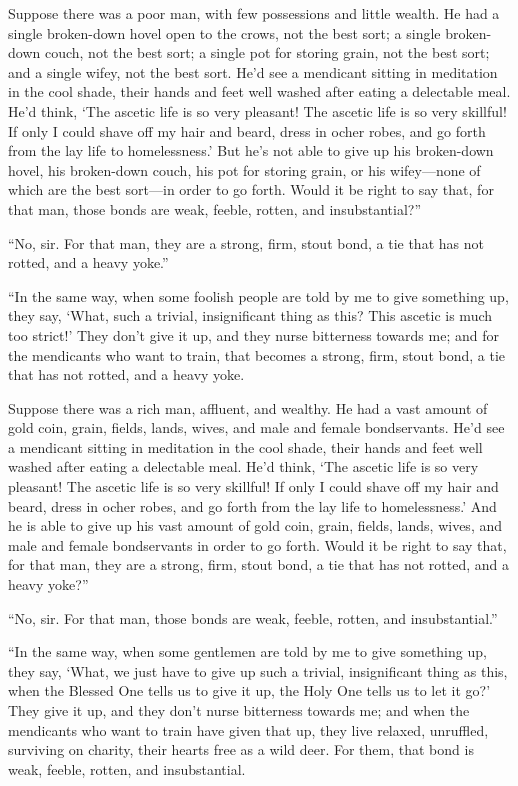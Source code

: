 \documentclass[12pt,openany]{book}%
\begin{document}
Suppose there was a poor man, with few possessions and little wealth. He had a single broken-down hovel open to the crows, not the best sort; a single broken-down couch, not the best sort; a single pot for storing grain, not the best sort; and a single wifey, not the best sort. He’d see a mendicant sitting in meditation in the cool shade, their hands and feet well washed after eating a delectable meal. He’d think, ‘The ascetic life is so very pleasant! The ascetic life is so very skillful! If only I could shave off my hair and beard, dress in ocher robes, and go forth from the lay life to homelessness.’ But he’s not able to give up his broken-down hovel, his broken-down couch, his pot for storing grain, or his wifey—none of which are the best sort—in order to go forth. Would it be right to say that, for that man, those bonds are weak, feeble, rotten, and insubstantial?” 

“No, sir. For that man, they are a strong, firm, stout bond, a tie that has not rotted, and a heavy yoke.” 

“In the same way, when some foolish people are told by me to give something up, they say, ‘What, such a trivial, insignificant thing as this? This ascetic is much too strict!’ They don’t give it up, and they nurse bitterness towards me; and for the mendicants who want to train, that becomes a strong, firm, stout bond, a tie that has not rotted, and a heavy yoke. 

Suppose there was a rich man, affluent, and wealthy. He had a vast amount of gold coin, grain, fields, lands, wives, and male and female bondservants. He’d see a mendicant sitting in meditation in the cool shade, their hands and feet well washed after eating a delectable meal. He’d think, ‘The ascetic life is so very pleasant! The ascetic life is so very skillful! If only I could shave off my hair and beard, dress in ocher robes, and go forth from the lay life to homelessness.’ And he is able to give up his vast amount of gold coin, grain, fields, lands, wives, and male and female bondservants in order to go forth. Would it be right to say that, for that man, they are a strong, firm, stout bond, a tie that has not rotted, and a heavy yoke?” 

“No, sir. For that man, those bonds are weak, feeble, rotten, and insubstantial.” 

“In the same way, when some gentlemen are told by me to give something up, they say, ‘What, we just have to give up such a trivial, insignificant thing as this, when the Blessed One tells us to give it up, the Holy One tells us to let it go?’ They give it up, and they don’t nurse bitterness towards me; and when the mendicants who want to train have given that up, they live relaxed, unruffled, surviving on charity, their hearts free as a wild deer. For them, that bond is weak, feeble, rotten, and insubstantial. 
\end{document}
